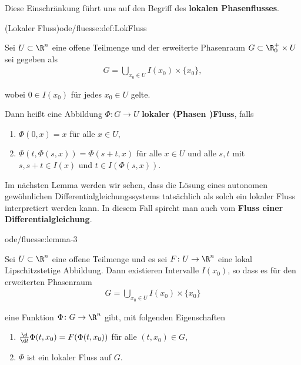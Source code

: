 \documentclass[letterpaper,10pt,german]{jupyterBook}
\begin{document}
\par
Diese Einschränkung führt uns auf den Begriff des \textbf{lokalen Phasenflusses}.
\begin{definition}{(Lokaler Fluss)}{ode/fluesse:def:LokFluss}



\par
Sei \(U \subset \R^n\) eine offene Teilmenge und der erweiterte Phasenraum \(G\subset \R^+_0\times U\) sei gegeben als
\begin{align*}
G = \bigcup_{x_0\in U} I(x_0) \times \{x_0\},
\end{align*}
\par
wobei \(0\in I(x_0)\) für jedes \(x_0\in U\) gelte.

\par
Dann heißt eine Abbildung \(\Phi: G\rightarrow U\) \textbf{lokaler (Phasen )Fluss}, falls
\begin{enumerate}

\item {} 
\par
\(\Phi(0,x) = x\) für alle \(x\in U\),

\item {} 
\par
\(\Phi(t, \Phi(s, x)) = \Phi(s+t, x)\) für alle \(x\in U\) und alle \(s,t\) mit \(s, s+t\in I(x)\) und \(t\in I(\Phi(s,x))\).

\end{enumerate}
\end{definition}

\par
Im nächsten Lemma werden wir sehen, dass die Lösung eines autonomen gewöhnlichen Differentialgleichungssystems tatsächlich als solch ein lokaler Fluss interpretiert werden kann.
In diesem Fall spircht man auch vom \textbf{Fluss einer Differentialgleichung}.
\begin{lemma}{}{ode/fluesse:lemma-3}



\par
Sei \(U\subset\R^n\) eine offene Teilmenge und es sei \(F \colon U \rightarrow \R^n\) eine lokal Lipschitzstetige Abbildung.
Dann existieren Intervalle \(I(x_0)\), so dass es für den erweiterten Phasenraum
\begin{align*}
G = \bigcup_{x_0\in U} I(x_0)\times\{x_0\}
\end{align*}
\par
eine Funktion \(\Phi \colon G\rightarrow \R^n\) gibt, mit folgenden Eigenschaften
\begin{enumerate}

\item {} 
\par
\(\frac{\d}{\d t} \Phi(t, x_0) = F(\Phi(t, x_0))\) für alle \((t,x_0)\in G\),

\item {} 
\par
\(\Phi\) ist ein lokaler Fluss auf \(G\).

\end{enumerate}
\end{lemma}
\end{document}
